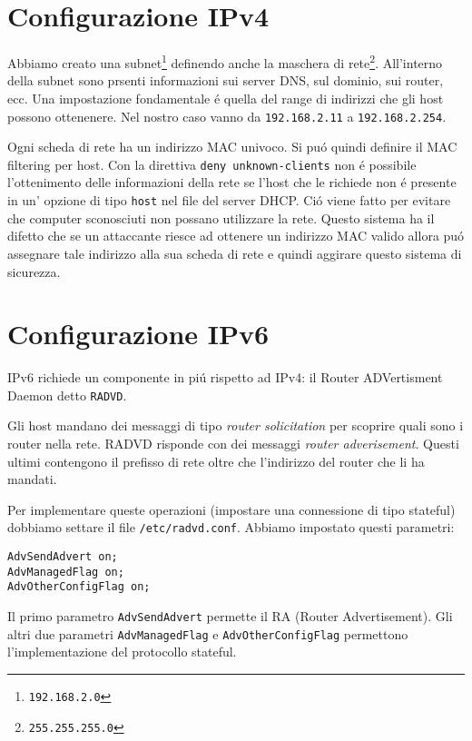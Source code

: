 \documentclass[9pt, a4paper, oneside]{article}
\begin{document}
		\section{Configurazione IPv4}
			\par
				Abbiamo creato una 
				subnet\footnote{\texttt{192.168.2.0}}
				definendo anche la maschera di 
				rete\footnote{\texttt{255.255.255.0}}.
				All'interno della subnet sono prsenti 
				informazioni sui server DNS, sul dominio, sui 
				router, ecc. Una impostazione fondamentale \'e 
				quella del range di indirizzi che gli host 
				possono ottenenere. Nel nostro caso vanno da 
				\texttt{192.168.2.11} a \texttt{192.168.2.254}.
			\par
				Ogni scheda di rete ha un indirizzo MAC 
				univoco. Si pu\'o quindi definire il MAC 
				filtering per host. Con la direttiva 
				\texttt{deny unknown-clients} 
				non \'e possibile l'ottenimento delle 
				informazioni della rete se l'host che le 
				richiede non \'e presente in un' opzione di 
				tipo \texttt{host} nel file del server DHCP. 
				Ci\'o viene fatto per evitare che computer
				sconosciuti non possano utilizzare la rete. 
				Questo sistema ha il difetto che se un 
				attaccante riesce ad ottenere un indirizzo MAC 
				valido allora pu\'o assegnare tale indirizzo 
				alla sua scheda di rete e quindi aggirare 
				questo sistema di sicurezza.\newpage
		\section{Configurazione IPv6}
			\par
				IPv6 richiede un componente in pi\'u rispetto 
				ad IPv4: il Router ADVertisment Daemon detto 
				\texttt{RADVD}. 
			\par
				Gli host mandano dei messaggi di tipo 
				\emph{router solicitation} per scoprire 	
				quali sono i router nella rete. RADVD risponde 
				con dei messaggi \emph{router adverisement}. 
				Questi ultimi contengono il prefisso 
				di rete oltre che l'indirizzo del router che 
				li ha mandati.
			\par
				Per implementare queste operazioni (impostare 
				una connessione di tipo stateful) dobbiamo 
				settare il file \texttt{/etc/radvd.conf}. 
				Abbiamo impostato questi parametri:
				\begin{verbatim}
AdvSendAdvert on;
AdvManagedFlag on;
AdvOtherConfigFlag on;
				\end{verbatim}
				Il primo parametro \texttt{AdvSendAdvert} 
				permette il RA (Router Advertisement).
				Gli altri due parametri 
				\texttt{AdvManagedFlag} e 
				\texttt{AdvOtherConfigFlag} permettono 
				l'implementazione del protocollo stateful. 				
\end{document}
